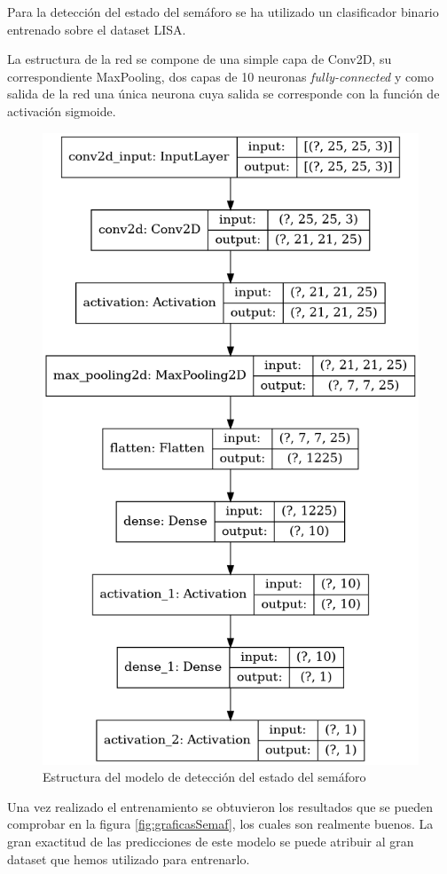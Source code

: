 Para la detección del estado del semáforo se ha utilizado un clasificador binario entrenado sobre el dataset LISA.

La estructura de la red se compone de una simple capa de Conv2D, su correspondiente MaxPooling, dos capas de 10 neuronas \textit{fully-connected} y como salida de la red una única neurona cuya salida se corresponde con la función de activación sigmoide.

\begin{figure}[h!]
    \centering
    \includegraphics[width=0.6\linewidth]{img/DiagramaModeloSemaf.png}
    \caption{Estructura del modelo de detección del estado del semáforo}
    \label{fig:diamSemaf}
\end{figure}

Una vez realizado el entrenamiento se obtuvieron los resultados que se pueden comprobar en la figura \ref{fig:graficasSemaf}, los cuales son realmente buenos. La gran exactitud de las predicciones de este modelo se puede atribuir al gran dataset que hemos utilizado para entrenarlo.

